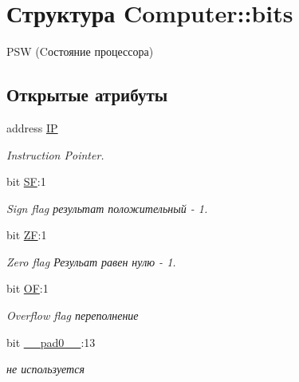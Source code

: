 \hypertarget{struct_computer_1_1bits}{}\section{Структура Computer\+:\+:bits}
\label{struct_computer_1_1bits}


P\+SW (Cостояние процессора)  


\subsection*{Открытые атрибуты}
\begin{DoxyCompactItemize}
\item 
\hypertarget{struct_computer_1_1bits_a7781883b446209714ad687e2a4f77526}{}\label{struct_computer_1_1bits_a7781883b446209714ad687e2a4f77526} 
address \hyperlink{struct_computer_1_1bits_a7781883b446209714ad687e2a4f77526}{IP}
\begin{DoxyCompactList}\small\item\em Instruction Pointer. \end{DoxyCompactList}\item 
\hypertarget{struct_computer_1_1bits_a74cfe87f17ba348db37c74bbd5e56828}{}\label{struct_computer_1_1bits_a74cfe87f17ba348db37c74bbd5e56828} 
bit \hyperlink{struct_computer_1_1bits_a74cfe87f17ba348db37c74bbd5e56828}{SF}\+:1
\begin{DoxyCompactList}\small\item\em Sign flag результат положительный -\/ 1. \end{DoxyCompactList}\item 
\hypertarget{struct_computer_1_1bits_a5307edeadd212f1fc19e9f6f5346df39}{}\label{struct_computer_1_1bits_a5307edeadd212f1fc19e9f6f5346df39} 
bit \hyperlink{struct_computer_1_1bits_a5307edeadd212f1fc19e9f6f5346df39}{ZF}\+:1
\begin{DoxyCompactList}\small\item\em Zero flag Резульат равен нулю -\/ 1. \end{DoxyCompactList}\item 
\hypertarget{struct_computer_1_1bits_aaec5be5e3ab9ea9aa4b1672af9e26312}{}\label{struct_computer_1_1bits_aaec5be5e3ab9ea9aa4b1672af9e26312} 
bit \hyperlink{struct_computer_1_1bits_aaec5be5e3ab9ea9aa4b1672af9e26312}{OF}\+:1
\begin{DoxyCompactList}\small\item\em Overflow flag переполнение \end{DoxyCompactList}\item 
\hypertarget{struct_computer_1_1bits_a40e6b988a2d0d733a19c3f75fad8a348}{}\label{struct_computer_1_1bits_a40e6b988a2d0d733a19c3f75fad8a348} 
bit \hyperlink{struct_computer_1_1bits_a40e6b988a2d0d733a19c3f75fad8a348}{\+\_\+\+\_\+pad0\+\_\+\+\_\+}\+:13
\begin{DoxyCompactList}\small\item\em не используется \end{DoxyCompactList}\end{DoxyCompactItemize}


